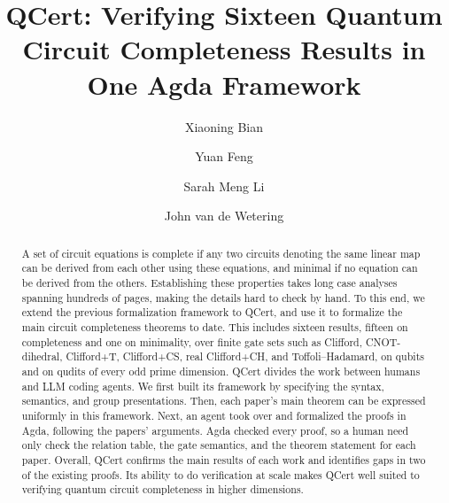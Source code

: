 \documentclass[acmsmall,nonacm,11pt,screen]{acmart}
\begin{document}
\title[QCert: Verifying Sixteen Quantum Circuit Completeness Results in One Agda Framework]{QCert: Verifying Sixteen Quantum Circuit Completeness Results in One Agda Framework}



\author{Xiaoning Bian}
\author{Yuan Feng}
\author{Sarah Meng Li}
\author{John van de Wetering}

\begin{abstract}

A set of circuit equations is complete if any two circuits denoting the same linear map can be derived from each other using these equations, and minimal if no equation can be derived from the others. Establishing these properties takes long case analyses spanning hundreds of pages, making the details hard to check by hand. To this end, we extend the previous formalization framework to QCert, and use it to formalize the main circuit completeness theorems to date. This includes sixteen results, fifteen on completeness and one on minimality, over finite gate sets such as Clifford, CNOT-dihedral, Clifford+T, Clifford+CS, real Clifford+CH, and Toffoli--Hadamard, on qubits and on qudits of every odd prime dimension. QCert divides the work between humans and LLM coding agents. We first built its framework by specifying the syntax, semantics, and group presentations. Then, each paper's main theorem can be expressed uniformly in this framework. Next, an agent took over and formalized the proofs in Agda, following the papers' arguments. Agda checked every proof, so a human need only check the relation table, the gate semantics, and the theorem statement for each paper. Overall, QCert confirms the main results of each work and identifies gaps in two of the existing proofs. Its ability to do verification at scale makes QCert well suited to verifying quantum circuit completeness in higher dimensions.

\end{abstract}
\end{document}
